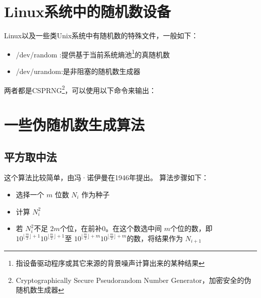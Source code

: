 \documentclass[12pt]{article}
\begin{document}
\section{Linux系统中的随机数设备}\label{linuxux7cfbux7edfux4e2dux7684ux968fux673aux6570ux8bbeux5907}

Linux以及一些类Unix系统中有随机数的特殊文件，一般如下：

\begin{itemize}
\tightlist
\item
  /dev/random :提供基于当前系统熵池\footnote{指设备驱动程序或其它来源的背景噪声计算出来的某种结果}的真随机数
\item
  /dev/urandom:是非阻塞的随机数生成器
\end{itemize}

两者都是CSPRNG\footnote{Cryptographically Secure Pseudorandom Number Generator，加密安全的伪随机数生成器}，可以使用以下命令来输出：

\begin{Shaded}
\begin{Highlighting}[]
   
\end{Highlighting}
\end{Shaded}

\section{一些伪随机数生成算法}\label{ux4e00ux4e9bux4f2aux968fux673aux6570ux751fux6210ux7b97ux6cd5}

\subsection{平方取中法}\label{ux5e73ux65b9ux53d6ux4e2dux6cd5}

这个算法比较简单，由冯·诺伊曼在1946年提出。 算法步骤如下：

\begin{itemize}
\tightlist
\item
  选择一个 \({\displaystyle m}\) 位数 \({\displaystyle N_{i}}\) 作为种子
\item
  计算 \({\displaystyle N_{i}^{2}}\)
\item
  若 \({\displaystyle N_{i}^{2}}\)不足 \({\displaystyle 2m}\)个位，在前补0。在这个数选中间 \({\displaystyle m}\)个位的数，即 \({\displaystyle 10^{\lfloor {\frac {m}{2}}\rfloor +1}} {\displaystyle 10^{\lfloor {\frac {m}{2}}\rfloor +1}}\)至 \({\displaystyle 10^{\lfloor {\frac {m}{2}}\rfloor +m}} {\displaystyle 10^{\lfloor {\frac {m}{2}}\rfloor +m}}\)的数，将结果作为 \({\displaystyle N_{i+1}}\)
\end{itemize}
\end{document}
